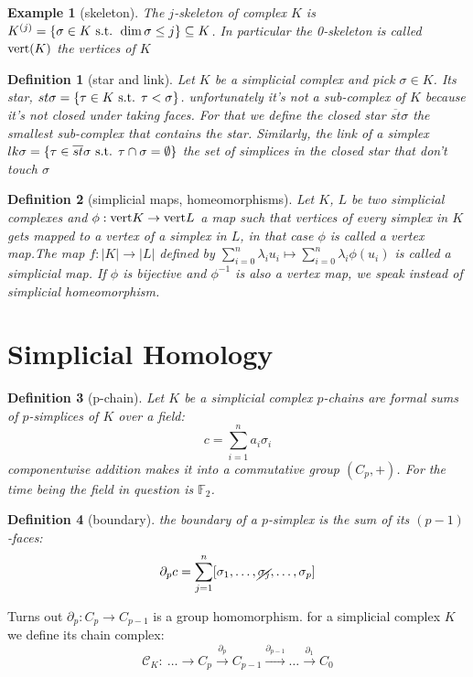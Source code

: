 \documentclass{article}
\newcommand{\inv}{^{-1}}
\newcommand{\vertices}{\textmd{vert}}
\newcommand{\st}{\textmd{ s.t. }}
\newtheorem{definition}{Definition}[section]
\newtheorem{example}{Example}[section]
\begin{document}
	\begin{example}[skeleton]
		The $j$-skeleton of complex $K$ is $K^{(j)}= \{ \sigma \in K \st \dim\sigma \leq j \} \subseteq K $. In particular the 0-skeleton is called $\vertices(K)$ the vertices of $K$
	\end{example}
	\begin{definition}[star and link]
		Let $K$ be a simplicial complex and pick $ \sigma \in K $. Its star, $ st\sigma = \{ \tau \in K \st \tau < \sigma \} $. unfortunately it's not a sub-complex of $K$ because it's not closed under taking faces. For that we define the closed star $ \overline{st}\sigma $ the smallest sub-complex that contains the star.
		Similarly, the link of a simplex $ lk\sigma = \{ \tau \in \overline{st}\sigma \st \tau \cap \sigma = \emptyset \} $ the set of simplices in the closed star that don't touch $\sigma$
	\end{definition}
	\begin{definition}[simplicial maps, homeomorphisms]
		Let $K$, $L$ be two simplicial complexes and $ \phi: \vertices K \to \vertices L $ a map such that vertices of every simplex in $K$ gets mapped to a vertex of a simplex in $L$, in that case $\phi$ is called a vertex map.The map $f: |K| \to |L|$ defined by $ \sum_{i=0}^n \lambda_i u_i \mapsto \sum_{i=0}^n \lambda_i \phi(u_i) $ is called a simplicial map. If $ \phi $ is bijective and $ \phi\inv $ is also a vertex map, we speak instead of simplicial homeomorphism.
	\end{definition}

	\section{Simplicial Homology}
	\begin{definition}[p-chain]
		Let $K$ be a simplicial complex $ p $-chains are formal sums of $p$-simplices of $K$ over a field: \[ c = \sum_{i=1}^{n} a_i \sigma_i \] componentwise addition makes it into a commutative group $ (C_p, +) $. For the time being the field in question is $ \mathbb{F}_2 $.
	\end{definition}
\begin{definition}[boundary]
	the boundary of a $ p $-simplex is the sum of its $ (p-1) $-faces: \[ \partial_p c = \sum_{j=1}^n [\sigma_1, \dots , \cancel{\sigma_j} , \dots , \sigma_p] \]
\end{definition}

Turns out $ \partial_p : C_p \to C_{p-1} $ is a group homomorphism. for a simplicial complex $K$ we define its chain complex:
\[\mathcal{C}_K: \ \dots \longrightarrow C_p \stackrel{\partial_p}{\longrightarrow} C_{p-1} \stackrel{\partial_{p-1}}{\longrightarrow} \dots \stackrel{\partial_1}{\longrightarrow} C_0 \]
\end{document}
